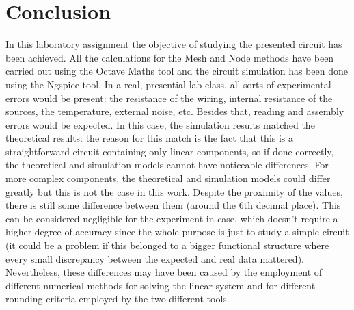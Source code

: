 \section{Conclusion}
\label{sec:conclusion}
In this laboratory assignment the objective of studying the presented circuit has been achieved. All the calculations for the Mesh and Node methods have been carried out using the Octave Maths tool and the circuit simulation has been done using the Ngspice tool. In a real, presential lab class, all sorts of experimental errors would be present: the resistance of the wiring, internal resistance of the sources, the temperature, external noise, etc. Besides that, reading and assembly errors would be expected. In this case, the simulation results matched the theoretical results: the reason for this match is the fact that this is a straightforward circuit containing only linear components, so if done correctly, the theoretical and simulation models cannot have noticeable differences. For more complex components, the theoretical and simulation models could differ greatly but this is not the case in this work. Despite the proximity of the values, there is still some difference between them (around the 6th decimal place). This can be considered negligible for the experiment in case, which doesn’t require a higher degree of accuracy since the whole purpose is just to study a simple circuit (it could be a problem if this belonged to a bigger functional structure where every small discrepancy between the expected and real data mattered). Nevertheless, these differences may have been caused by the employment of different numerical methods for solving the linear system and for different rounding criteria employed by the two different tools.
